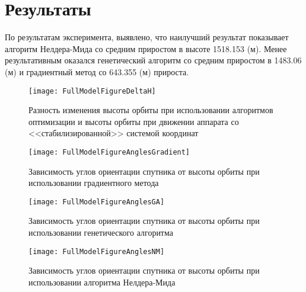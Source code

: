 \section{Результаты}
\noindent\indent По результатам эксперимента, выявлено, что наилучший результат
показывает алгоритм Нелдера-Мида со средним приростом в высоте 1518.153 (м). Менее
результативным оказался генетический алгоритм со средним приростом в 1483.06 (м) и
градиентный метод со 643.355 (м) прироста.
\begin{figure}[h]
  \centering
  \texttt{[image: FullModelFigureDeltaH]}
  \caption{Разность изменения высоты орбиты при использовании алгоритмов оптимизации
  и высоты орбиты при движении аппарата со <<стабилизированной>> системой координат }
  \label{fig:KeplerParams2Angles}
\end{figure}\par
\begin{figure}[h]
  \centering
  \texttt{[image: FullModelFigureAnglesGradient]}
  \caption{Зависимость углов ориентации спутника от высоты орбиты при использовании
  градиентного метода}
  \label{fig:KeplerParams2Angles}
\end{figure}\par
\begin{figure}[h]
  \centering
  \texttt{[image: FullModelFigureAnglesGA]}
  \caption{Зависимость углов ориентации спутника от высоты орбиты при использовании
  генетического алгоритма}
  \label{fig:KeplerParams2Angles}
\end{figure}\par
\begin{figure}[!h]
  \centering
  \texttt{[image: FullModelFigureAnglesNM]}
  \caption{Зависимость углов ориентации спутника от высоты орбиты при использовании
  алгоритма Нелдера-Мида}
  \label{fig:KeplerParams2Angles}
\end{figure}
\clearpage
